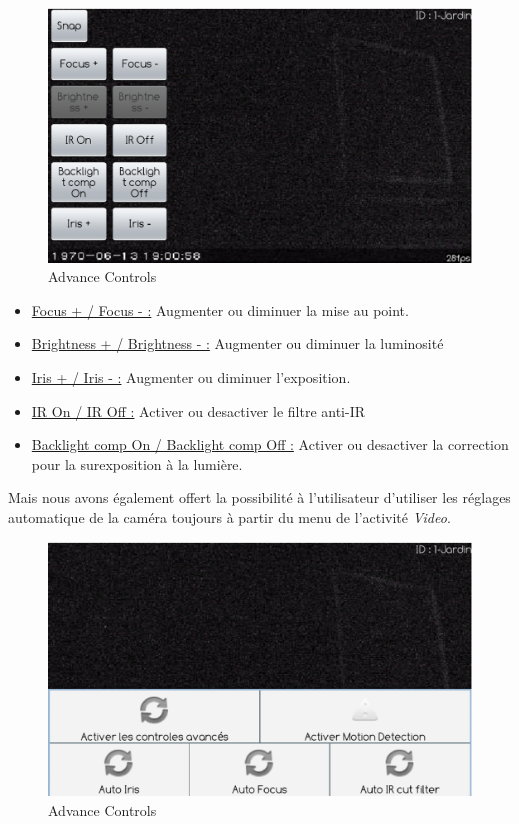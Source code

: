 \begin{figure}[H]
  \label{ctrl2}
  \centering
   \includegraphics[scale=0.4]{Images/ctrl2.eps}
  \caption{Advance Controls}
\end{figure}  
\begin{itemize}
  \item \underline{Focus + / Focus - :} Augmenter ou diminuer la mise au
  point.
  \item \underline{Brightness + / Brightness - :} Augmenter ou diminuer la luminosité
  \item \underline{Iris + / Iris - :} Augmenter ou diminuer l'exposition.
  \item \underline{IR On / IR Off :} Activer ou desactiver le filtre
  anti-IR
  \item \underline{Backlight comp On / Backlight comp Off :} Activer ou
  desactiver la correction pour la surexposition à la lumière.
\end{itemize}
Mais nous avons également offert la possibilité à l'utilisateur d'utiliser les
réglages automatique de la caméra toujours à partir du menu de l'activité
\textit{Video}.
\begin{figure}[H]
  \label{ctrl2}
  \centering
   \includegraphics[scale=0.4]{Images/ctrl1.eps}
  \caption{Advance Controls}
\end{figure}  

